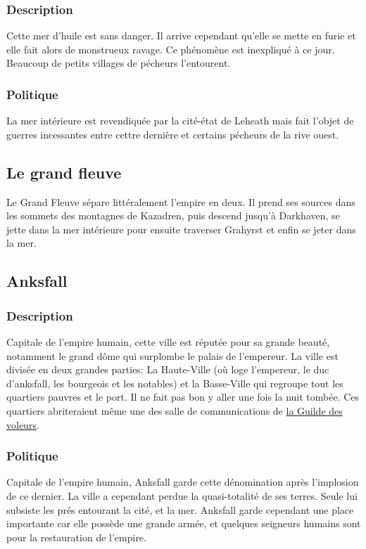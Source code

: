 \subsubsection{Description}
\hypertarget {lamerinterieure}{}Cette mer d'huile est sans danger.
Il arrive cependant qu’elle se mette en furie et elle fait alors de monstrueux ravage.
Ce phénomène est inexpliqué à ce jour.
Beaucoup de petits villages de pécheurs l'entourent.
\subsubsection{Politique}
La mer intérieure est revendiquée par la cité-état de Leheath mais fait l'objet de guerres incessantes entre cettre dernière et certains pécheurs de la rive ouest.
\subsection{Le grand fleuve}
Le Grand Fleuve sépare littéralement l'empire en deux. Il prend ses sources dans les sommets des montagnes de Kazadren, puis descend jusqu'à Darkhaven, se jette dans la mer intérieure pour ensuite traverser Grahyrst et enfin se jeter dans la mer.
\subsection{Anksfall}
\subsubsection{Description}
\hypertarget{anksfall}{}Capitale de l'empire humain, cette ville est réputée pour sa grande beauté,
notamment le grand dôme qui surplombe le palais de l'empereur. 
La ville est divisée en deux grandes parties: La Haute-Ville 
(où loge l’empereur, le duc d'anksfall, les bourgeois et les notables)
et la Basse-Ville qui regroupe tout les quartiers pauvres et le port.
Il ne fait pas bon y aller une fois la nuit tombée.
Ces quartiers abriteraient même une des salle de communications de \hyperlink {laguildedesvoleurs}{la Guilde des voleurs}.
\subsubsection{Politique}
Capitale de l'empire humain, Anksfall garde cette dénomination après l'implosion de ce dernier. La ville a cependant perdue la quasi-totalité de ses terres. Seule lui subsiste les prés entourant la cité, et la mer.
\newline
Anksfall garde cependant une place importante car elle possède une grande armée, et quelques seigneurs humains sont pour la restauration de l'empire.
